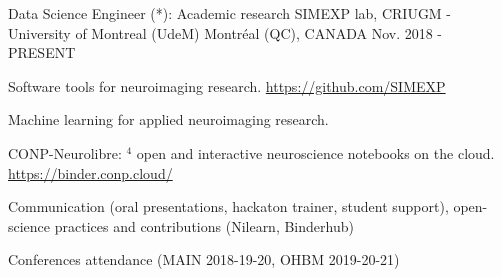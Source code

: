 


\begin{cventries}



\cventry
{Data Science Engineer (*): Academic research}%
{SIMEXP lab, CRIUGM - University of Montreal (UdeM)} %
{\hspace{-5mm}Montréal (QC), CANADA} %
{Nov. 2018 - PRESENT} %
{ %
	\begin{cvitems}
		\item {Software tools for neuroimaging research. \url{https://github.com/SIMEXP}}
		\item {Machine learning for applied neuroimaging research.}
		\item {CONP-Neurolibre: \hyperref[award:4]{$^4$} open and interactive neuroscience notebooks on the cloud. \url{https://binder.conp.cloud/}}
		\item {Communication (oral presentations, hackaton trainer, student support), open-science practices and contributions (Nilearn, Binderhub)}
		\item {Conferences attendance (MAIN 2018-19-20, OHBM 2019-20-21)}
	\end{cvitems}
}



\end{cventries}
